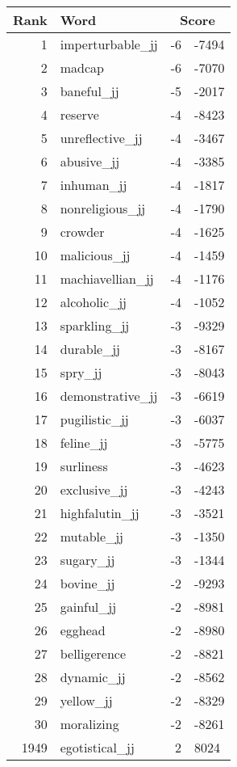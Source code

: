 \begin{longtable}[!htbp]{| rlr@{.}l |}
    \hline
    \textbf{Rank} & \textbf{Word} & \multicolumn{2}{c|}{\textbf{Score}} \\
    \hline
    \endhead
    1 & imperturbable\_jj & -6 & -7494 \\
    2 & madcap & -6 & -7070 \\
    3 & baneful\_jj & -5 & -2017 \\
    4 & reserve & -4 & -8423 \\
    5 & unreflective\_jj & -4 & -3467 \\
    6 & abusive\_jj & -4 & -3385 \\
    7 & inhuman\_jj & -4 & -1817 \\
    8 & nonreligious\_jj & -4 & -1790 \\
    9 & crowder & -4 & -1625 \\
    10 & malicious\_jj & -4 & -1459 \\
    11 & machiavellian\_jj & -4 & -1176 \\
    12 & alcoholic\_jj & -4 & -1052 \\
    13 & sparkling\_jj & -3 & -9329 \\
    14 & durable\_jj & -3 & -8167 \\
    15 & spry\_jj & -3 & -8043 \\
    16 & demonstrative\_jj & -3 & -6619 \\
    17 & pugilistic\_jj & -3 & -6037 \\
    18 & feline\_jj & -3 & -5775 \\
    19 & surliness & -3 & -4623 \\
    20 & exclusive\_jj & -3 & -4243 \\
    21 & highfalutin\_jj & -3 & -3521 \\
    22 & mutable\_jj & -3 & -1350 \\
    23 & sugary\_jj & -3 & -1344 \\
    24 & bovine\_jj & -2 & -9293 \\
    25 & gainful\_jj & -2 & -8981 \\
    26 & egghead & -2 & -8980 \\
    27 & belligerence & -2 & -8821 \\
    28 & dynamic\_jj & -2 & -8562 \\
    29 & yellow\_jj & -2 & -8329 \\
    30 & moralizing & -2 & -8261 \\
    1949 & egotistical\_jj & 2 & 8024 \\

\end{longtable}
